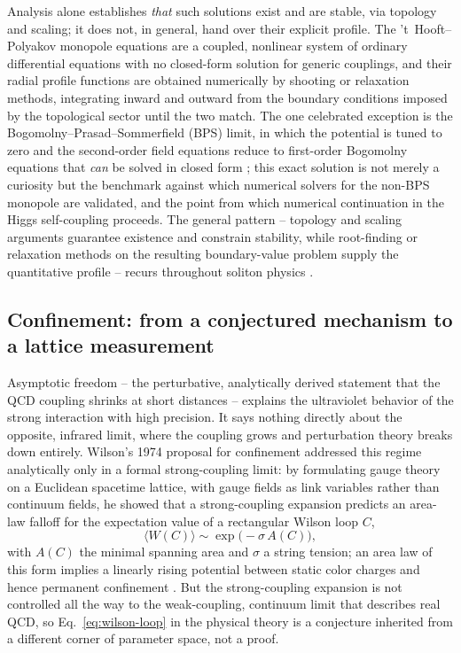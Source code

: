 Analysis alone establishes \emph{that} such solutions exist and are stable, via
topology and scaling; it does not, in general, hand over their explicit
profile. The 't~Hooft--Polyakov monopole equations are a coupled, nonlinear
system of ordinary differential equations with no closed-form solution for
generic couplings, and their radial profile functions are obtained numerically
by shooting or relaxation methods, integrating inward and outward from the
boundary conditions imposed by the topological sector until the two match. The
one celebrated exception is the Bogomolny--Prasad--Sommerfield (BPS) limit, in
which the potential is tuned to zero and the second-order field equations
reduce to first-order Bogomolny equations that \emph{can} be solved in closed
form \cite{PrasadSommerfield1975}; this exact solution is not merely a
curiosity but the benchmark against which numerical solvers for the non-BPS
monopole are validated, and the point from which numerical continuation in the
Higgs self-coupling proceeds. The general pattern -- topology and scaling
arguments guarantee existence and constrain stability, while root-finding or
relaxation methods on the resulting boundary-value problem supply the
quantitative profile -- recurs throughout soliton physics
\cite{MantonSutcliffe2004}.

\subsection{Confinement: from a conjectured mechanism to a lattice measurement}

Asymptotic freedom -- the perturbative, analytically derived statement that the
QCD coupling shrinks at short distances -- explains the ultraviolet behavior of
the strong interaction with high precision. It says nothing directly about the
opposite, infrared limit, where the coupling grows and perturbation theory
breaks down entirely. Wilson's 1974 proposal for confinement addressed this
regime analytically only in a formal strong-coupling limit: by formulating
gauge theory on a Euclidean spacetime lattice, with gauge fields as link
variables rather than continuum fields, he showed that a strong-coupling
expansion predicts an area-law falloff for the expectation value of a
rectangular Wilson loop $C$,
\begin{equation}
\langle W(C) \rangle \sim \exp\!\big(-\sigma \, A(C)\big),
\label{eq:wilson-loop}
\end{equation}
with $A(C)$ the minimal spanning area and $\sigma$ a string tension; an area
law of this form implies a linearly rising potential between static color
charges and hence permanent confinement \cite{Wilson1974}. But the
strong-coupling expansion is not controlled all the way to the weak-coupling,
continuum limit that describes real QCD, so Eq.~\eqref{eq:wilson-loop} in the
physical theory is a conjecture inherited from a different corner of parameter
space, not a proof.

